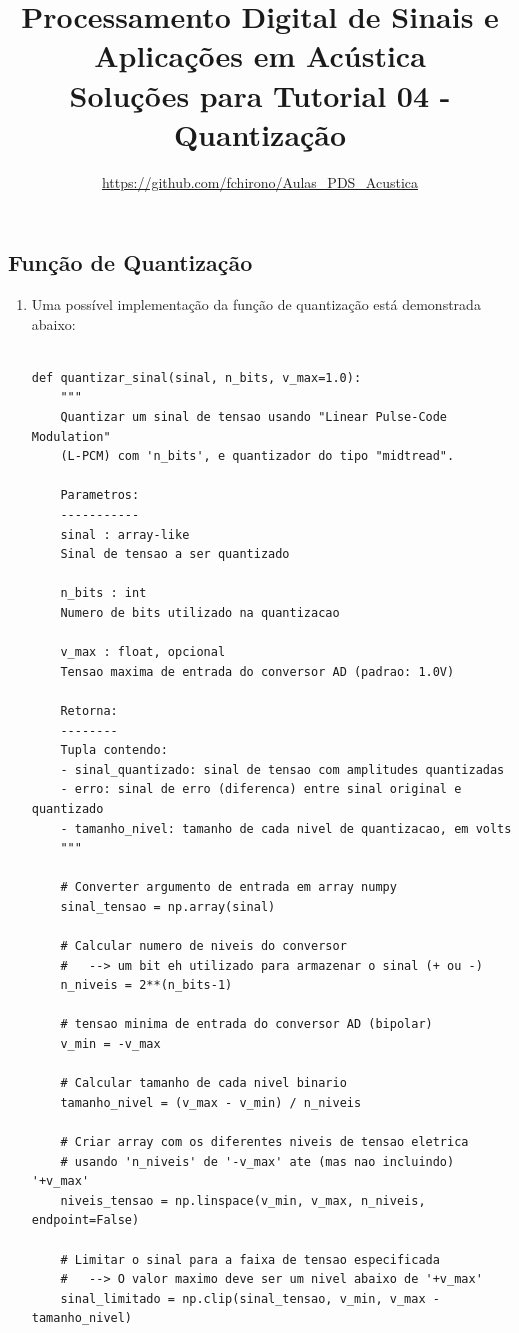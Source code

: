 \documentclass[a4paper,twoside,12pt]{article}
\title{\vspace{-2cm} Processamento Digital de Sinais e Aplicações em Acústica\\ Soluções para Tutorial 04 - Quantização}
\author{\url{https://github.com/fchirono/Aulas_PDS_Acustica}}
\begin{document}
	\date{}
	\maketitle
	
	\setcounter{section}{2}
	\subsection{Função de Quantização}
	
	\begin{enumerate}
		\item Uma possível implementação da função de quantização está demonstrada abaixo:
	
\begin{lstlisting}[frame=single]

def quantizar_sinal(sinal, n_bits, v_max=1.0):
	"""
	Quantizar um sinal de tensao usando "Linear Pulse-Code Modulation"
	(L-PCM) com 'n_bits', e quantizador do tipo "midtread".
	
	Parametros:
	-----------
	sinal : array-like
	Sinal de tensao a ser quantizado
	
	n_bits : int
	Numero de bits utilizado na quantizacao
	
	v_max : float, opcional
	Tensao maxima de entrada do conversor AD (padrao: 1.0V)
	
	Retorna:
	--------
	Tupla contendo:
	- sinal_quantizado: sinal de tensao com amplitudes quantizadas
	- erro: sinal de erro (diferenca) entre sinal original e quantizado
	- tamanho_nivel: tamanho de cada nivel de quantizacao, em volts
	"""
	
	# Converter argumento de entrada em array numpy
	sinal_tensao = np.array(sinal)
	
	# Calcular numero de niveis do conversor
	#   --> um bit eh utilizado para armazenar o sinal (+ ou -)
	n_niveis = 2**(n_bits-1)
	
	# tensao minima de entrada do conversor AD (bipolar)
	v_min = -v_max
	
	# Calcular tamanho de cada nivel binario
	tamanho_nivel = (v_max - v_min) / n_niveis
	
	# Criar array com os diferentes niveis de tensao eletrica
	# usando 'n_niveis' de '-v_max' ate (mas nao incluindo) '+v_max'
	niveis_tensao = np.linspace(v_min, v_max, n_niveis, endpoint=False)
	
	# Limitar o sinal para a faixa de tensao especificada
	#   --> O valor maximo deve ser um nivel abaixo de '+v_max'
	sinal_limitado = np.clip(sinal_tensao, v_min, v_max - tamanho_nivel)
	

\end{lstlisting}
\end{enumerate}
\end{document}
